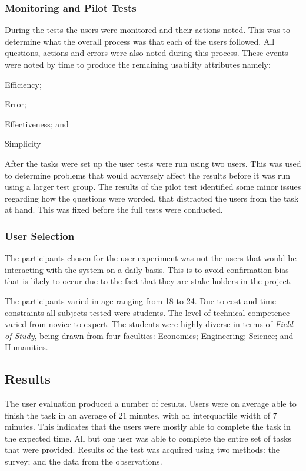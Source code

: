 \documentclass[12pt,a4paper]{report}
\begin{document}
\subsubsection{Monitoring and Pilot Tests}
During the tests the users were monitored and their actions noted. This was to
determine what the overall process was that each of the users followed. All
questions, actions and errors were also noted during this process. These events
were noted by time to produce the remaining usability attributes namely:
\begin{inparaenum}[(i)]\item Efficiency; \item Error; \item Effectiveness; and \item
Simplicity  \end{inparaenum}

After the tasks were set up the user tests were run using two users. This was
used to determine problems that would adversely affect the results before it was
run using a larger test group. The results of the pilot test identified some
minor issues regarding how the questions were worded, that distracted the users
from the task at hand. This was fixed before the full tests were conducted.

\subsubsection{User Selection}
The participants chosen for the user experiment was not the users that would
be interacting with the system on a daily basis. This is to avoid confirmation
bias that is likely to occur due to the fact that they are stake holders in the
project\cite{kaptchuk2003effect}.

The participants varied in age ranging from 18 to 24. Due to cost and time
constraints all subjects tested were students. The level of
technical competence varied from novice to expert. The students were highly
diverse in terms of \emph{Field of Study}, being drawn from four faculties:
Economics; Engineering; Science; and Humanities. 

\subsection{Results}
The user evaluation produced a number of results. Users were on average able to
finish the task in an average of $21$ minutes, with an interquartile width of
$7$ minutes. This indicates that the users were mostly able to complete the task
in the expected time. All but one user was able to complete the
entire set of tasks that were provided. Results of the test was acquired using two
methods: the survey; and the data from the observations.
\end{document}

